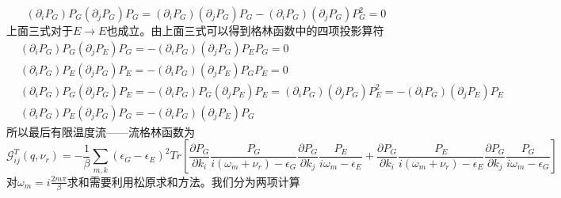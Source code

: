 \documentclass{article}
\numberwithin{equation}{subsection}
\begin{document}
\begin{equation}
    \left(\partial_{i} P_{G}\right) P_{G}\left(\partial_{j} P_{G}\right) P_{G}=\left(\partial_{i} P_{G}\right)\left(\partial_{j} P_{G}\right) P_{G}-\left(\partial_{i} P_{G}\right)\left(\partial_{j} P_{G}\right) P_{G}^{2}=0
\end{equation}
上面三式对于$E\rightarrow E$也成立。由上面三式可以得到格林函数中的四项投影算符
\begin{equation}
    \begin{split}
        &\left(\partial_{i} P_{G}\right) P_{G}\left(\partial_{j} P_{E}\right) P_{G}=-\left(\partial_{i} P_{G}\right)\left(\partial_{j} P_{G}\right) P_{E} P_{G}=0\\
        &\left(\partial_{i} P_{G}\right) P_{E}\left(\partial_{j} P_{G}\right) P_{E}=-\left(\partial_{i} P_{G}\right)\left(\partial_{j} P_{E}\right) P_{G} P_{E}=0\\
        &\left(\partial_{i} P_{G}\right) P_{G}\left(\partial_{j} P_{G}\right) P_{E}=-\left(\partial_{i} P_{G}\right) P_{G}\left(\partial_{j} P_{E}\right) P_{E}=\left(\partial_{i} P_{G}\right)\left(\partial_{j} P_{G}\right) P_{E}^{2}=-\left(\partial_{i} P_{G}\right)\left(\partial_{j} P_{E}\right) P_{E}\\
        &\left(\partial_{i} P_{G}\right) P_{E}\left(\partial_{j} P_{G}\right) P_{G}=-\left(\partial_{i} P_{G}\right)\left(\partial_{j} P_{E}\right) P_{G}
    \end{split}
\end{equation}
所以最后有限温度流——流格林函数为
\begin{equation}
    \mathcal{G}_{ij}^T(q,\nu_r)=-\frac{1}{\beta}\sum_{m,k}(\epsilon_G-\epsilon_E)^2Tr\left[\frac{\partial P_G}{\partial k_i}\frac{P_G}{i(\omega_m+\nu_r)-\epsilon_G}\frac{\partial P_G}{\partial k_j}\frac{P_E}{i\omega_m-\epsilon_E}+\frac{\partial P_G}{\partial k_i}\frac{P_E}{i(\omega_m+\nu_r)-\epsilon_E}\frac{\partial P_G}{\partial k_j}\frac{P_G}{i\omega_m-\epsilon_G}\right]
\end{equation}
对$\omega_m=i\frac{2m\pi}{\beta}$求和需要利用松原求和方法。我们分为两项计算
\end{document}
